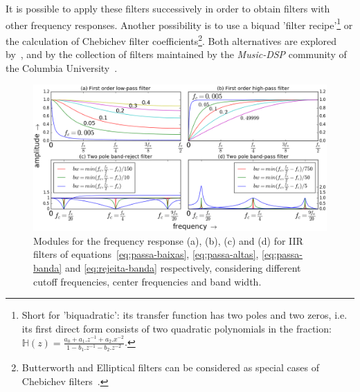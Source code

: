 It is possible to apply these filters successively in order to obtain filters with other frequency responses. Another possibility is to use a biquad 'filter recipe'\footnote{Short for 'biquadratic': its transfer function has two poles and two zeros, i.e. its first direct form consists of two quadratic polynomials in the fraction: $\mathbb{H}(z)=\frac{a_0+a_1.z^{-1}+a_2.x^{-2}}{1- b_1.z^{-1} -b_2 . z^{-2}}$.} or the calculation of Chebichev filter coefficients\footnote{Butterworth and Elliptical filters can be considered as special cases of Chebichev filters~\cite{Openheim,smith}.}.
Both alternatives are explored by~\cite{JOSFM,smith}, and by the collection of filters maintained by the \emph{Music-DSP} community of the Columbia University~\cite{music-dsp,Openheim}.

\begin{figure}
    \centering
        \includegraphics[width=\textwidth]{figures/iir__}
    \caption{Modules for the frequency response (a), (b), (c) and (d) for IIR filters of equations~\ref{eq:passa-baixas}, \ref{eq:passa-altas}, \ref{eq:passa-banda} and \ref{eq:rejeita-banda} respectively, considering different cutoff frequencies, center frequencies and band width.}
        \label{fig:iir}
\end{figure}

